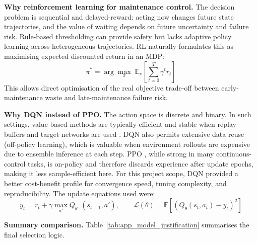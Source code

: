 \documentclass[12pt,a4paper]{report}
\begin{document}
\textbf{Why reinforcement learning for maintenance control.} The decision problem is sequential and delayed-reward: acting now changes future state trajectories, and the value of waiting depends on future uncertainty and failure risk. Rule-based thresholding can provide safety but lacks adaptive policy learning across heterogeneous trajectories. RL naturally formulates this as maximising expected discounted return in an MDP:
\begin{equation}
\pi^* = \arg\max_{\pi} \; \mathbb{E}_{\pi}\left[\sum_{t=0}^{T} \gamma^t r_t\right]
\end{equation}
This allows direct optimisation of the real objective trade-off between early-maintenance waste and late-maintenance failure risk.


\textbf{Why DQN instead of PPO.} The action space is discrete and binary. In such settings, value-based methods are typically efficient and stable when replay buffers and target networks are used \citep{mnih2015human}. DQN also permits extensive data reuse (off-policy learning), which is valuable when environment rollouts are expensive due to ensemble inference at each step. PPO \citep{schulman2017proximal}, while strong in many continuous-control tasks, is on-policy and therefore discards experience after update epochs, making it less sample-efficient here. For this project scope, DQN provided a better cost-benefit profile for convergence speed, tuning complexity, and reproducibility. The update equations used were:
\begin{equation}
y_t = r_t + \gamma \max_{a'}Q_{\theta^-}(s_{t+1}, a'), \qquad
\mathcal{L}(\theta)=\mathbb{E}\left[(Q_{\theta}(s_t,a_t)-y_t)^2\right]
\end{equation}


\textbf{Summary comparison.} Table~\ref{tab:app_model_justification} summarises the final selection logic.
\end{document}
